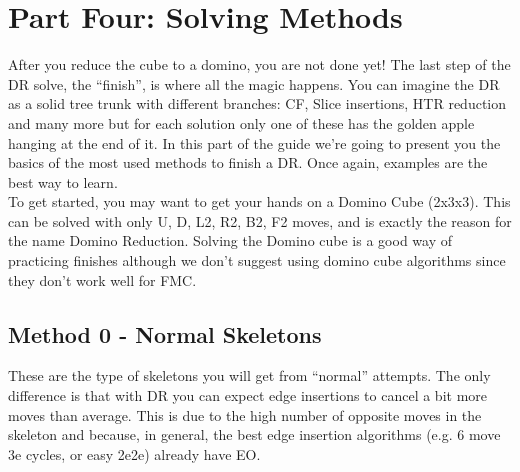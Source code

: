 \documentclass[11pt,a4paper]{book}
\begin{document}
\chapter{Part Four: Solving Methods}

After you reduce the cube to a domino, you are not done yet! The last step of the DR solve, the “finish”, is where all the magic happens.
You can imagine the DR as a solid tree trunk with different branches: CF, Slice insertions, HTR reduction and many more but for each solution only one of these has the golden apple hanging at the end of it.
In this part of the guide we’re going to present you the basics of the most used methods to finish a DR. Once again, examples are the best way to learn.\\
\newline
To get started, you may want to get your hands on a Domino Cube (2x3x3). This can be solved with only U, D, L2, R2, B2, F2 moves, and is exactly the reason for the name Domino Reduction.
Solving the Domino cube is a good way of practicing finishes although we don’t suggest using domino cube algorithms since they don’t work well for FMC.\\

\bigskip
\section{Method 0 - Normal Skeletons}

These are the type of skeletons you will get from “normal” attempts. The only difference is that with DR you can expect edge insertions to cancel a bit more moves than average.  This is due to the high number of opposite moves in the skeleton and because, in general, the best edge insertion algorithms (e.g. 6 move 3e cycles, or easy 2e2e) already have EO.\\
\end{document}
